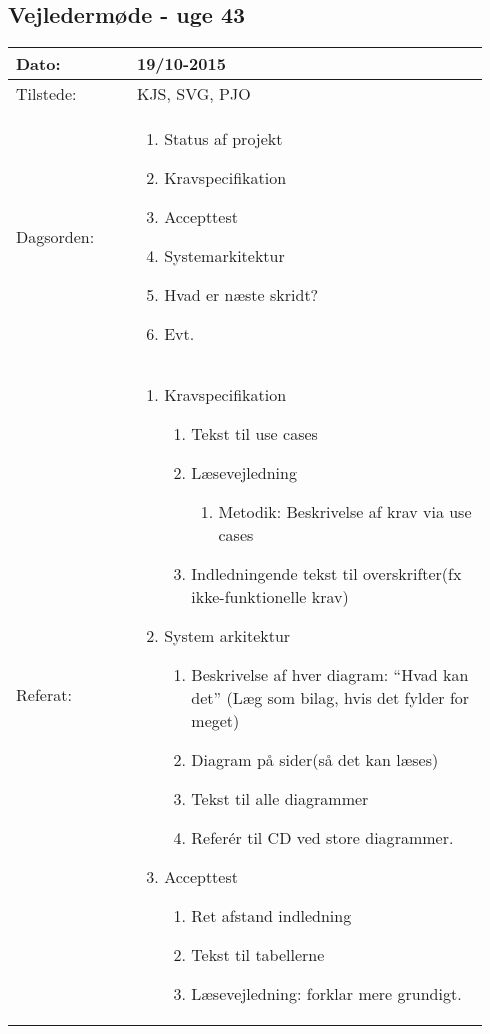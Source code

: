 	\subsection{Vejledermøde - uge 43}
	\begin{longtable}{|p{0.24\linewidth}|p{0.7\linewidth}|}
		\hline
		Dato: & 19/10-2015\\ \hline
		Tilstede: & KJS, SVG, PJO\\ \hline
		Dagsorden: &
		\begin{enumerate}
			\item Status af projekt
			\item Kravspecifikation
			\item Accepttest
			\item Systemarkitektur
			\item Hvad er næste skridt? 
			\item Evt. 
		\end{enumerate}
		\\ \hline
		Referat: & 
		\begin{enumerate}
			\item Kravspecifikation 
			\begin{enumerate}
				\item Tekst til use cases 
				\item Læsevejledning
				\begin{enumerate}
					\item Metodik: Beskrivelse af krav via use cases
				\end{enumerate}
				\item Indledningende tekst til overskrifter(fx ikke-funktionelle krav) 
			\end{enumerate}
			\item System arkitektur
			\begin{enumerate}
				\item Beskrivelse af hver diagram: “Hvad kan det” (Læg som bilag, hvis det fylder for meget) 
				\item Diagram på sider(så det kan læses) 
				\item Tekst til alle diagrammer 
				\item Referér til CD ved store diagrammer. 
			\end{enumerate}
			\item Accepttest
			\begin{enumerate}
				\item Ret afstand indledning
				\item Tekst til tabellerne
				\item Læsevejledning: forklar mere grundigt. 

\end{enumerate}
\end{enumerate}
\end{longtable}
